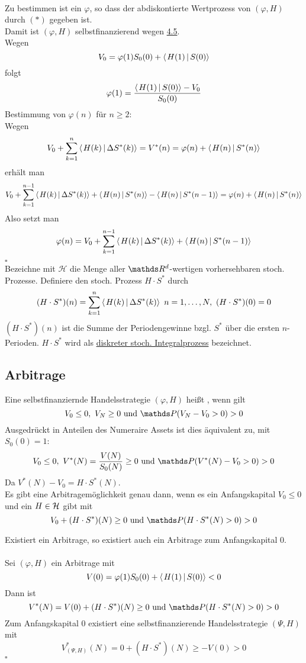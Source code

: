 \\
Zu bestimmen ist ein $\varphi$, so dass der abdiskontierte Wertprozess von $(\varphi,H)$ durch $(\ast)$ gegeben ist.\\
Damit ist $(\varphi,H)$ selbstfinanzierend wegen \hyperref[sub:charkt_selbstfinanzierung]{4.5}.\\
Wegen
\[
V_0=\varphi(1)S_0(0)+\sprod{H(1)}{S(0)}
\]
folgt
\[
\varphi(1)=\frac{\sprod{H(1)}{S(0)}-V_0}{S_0(0)}
\]
Bestimmung von $\varphi(n)$ für $n\ge 2$:\\
Wegen
\[
V_0+\sum_{k=1}^{n}\sprod{H(k)}{\Delta S^*(k)}=V^*(n)=\varphi(n)+\sprod{H(n)}{S^*(n)}
\]
erhält man
\[
V_0+\sum_{k=1}^{n-1}\sprod{H(k)}{\Delta S^*(k)}+\sprod{H(n)}{S^*(n)}-\sprod{H(n)}{S^*(n-1)}=\varphi(n)+\sprod{H(n)}{S^*(n)}
\]
Also setzt man
\[
\varphi(n)=V_0+\sum_{k=1}^{n-1}\sprod{H(k)}{\Delta S^*(k)}+\sprod{H(n)}{S^*(n-1)}
\]
\hfill $\square$\\
Bezeichne mit $\mathcal{H}$ die Menge aller $\R^d$-wertigen vorhersehbaren stoch. Prozesse.
Definiere den stoch. Prozess $H\cdot S^*$ durch
\[
(H\cdot S^*)(n)=\sum_{k=1}^{n}\sprod{H(k)}{\Delta S^*(k)}~ n=1,\dots,N,~ (H\cdot S^*)(0)=0
\]
$(H\cdot S^*)(n)$ ist die Summe der Periodengewinne bzgl. $S^*$ über die ersten $n$-Perioden.
$H\cdot S^*$ wird als \uline{diskreter stoch. Integralprozess} bezeichnet.


\subsection{Arbitrage}
\label{sub:arbitrage_math}
Eine selbstfinanziernde Handelsstrategie $(\varphi,H)$ heißt , wenn gilt 
\[
V_0\le 0,~V_N\ge 0 \text{ und } \Pw(V_N-V_0>0)>0
\]
Ausgedrückt in Anteilen des Numeraire Assets ist dies äquivalent zu, mit $S_0(0)=1$:
\[
V_0\le 0,~ V^*(N)=\frac{V(N)}{S_0(N)}\ge 0 \text{ und } \Pw(V^*(N)-V_0 > 0) > 0
\]
Da $V^*(N)-V_0=H\cdot S^*(N)$.\\
Es gibt eine Arbitragemöglichkeit genau dann, wenn es ein Anfangskapital $V_0\le 0$ und ein $H\in \mathcal{H}$ gibt mit
\[
V_0+(H\cdot S^*)(N)\ge 0 \text{ und } \Pw(H\cdot S^*(N)>0)>0
\]

Existiert ein Arbitrage, so existiert auch ein Arbitrage zum Anfangskapital 0.\\

\\
Sei $(\varphi,H)$ ein Arbitrage mit
\[
V(0)=\varphi(1)S_0(0)+\sprod{H(1)}{S(0)}<0
\]
Dann ist
\[
V^*(N)=V(0)+(H\cdot S^*)(N)\ge 0 \text{ und } \Pw(H\cdot S^*(N)>0)>0
\]
Zum Anfangskapital 0 existiert eine selbstfinanzierende Handelsstrategie $(\Psi,H)$ mit 
\[
V_{(\Psi,H)}^*(N)= 0+ (H\cdot S^*)(N)\ge -V(0)>0
\]
\hfill $\square$

